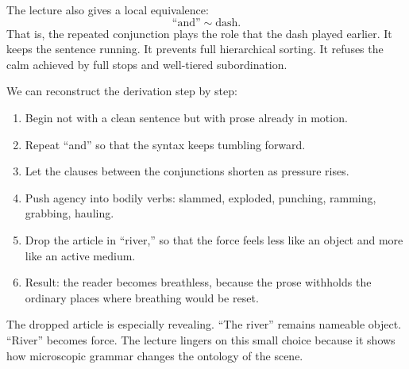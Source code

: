 The lecture also gives a local equivalence:
\begin{equation}
\text{``and''} \sim \text{dash}.
\end{equation}
That is, the repeated conjunction plays the role that the dash played earlier. It keeps the sentence running. It prevents full hierarchical sorting. It refuses the calm achieved by full stops and well-tiered subordination.

We can reconstruct the derivation step by step:
\begin{enumerate}
\item Begin not with a clean sentence but with prose already in motion.
\item Repeat ``and'' so that the syntax keeps tumbling forward.
\item Let the clauses between the conjunctions shorten as pressure rises.
\item Push agency into bodily verbs: slammed, exploded, punching, ramming, grabbing, hauling.
\item Drop the article in ``river,'' so that the force feels less like an object and more like an active medium.
\item Result: the reader becomes breathless, because the prose withholds the ordinary places where breathing would be reset.
\end{enumerate}

The dropped article is especially revealing. ``The river'' remains nameable object. ``River'' becomes force. The lecture lingers on this small choice because it shows how microscopic grammar changes the ontology of the scene.

